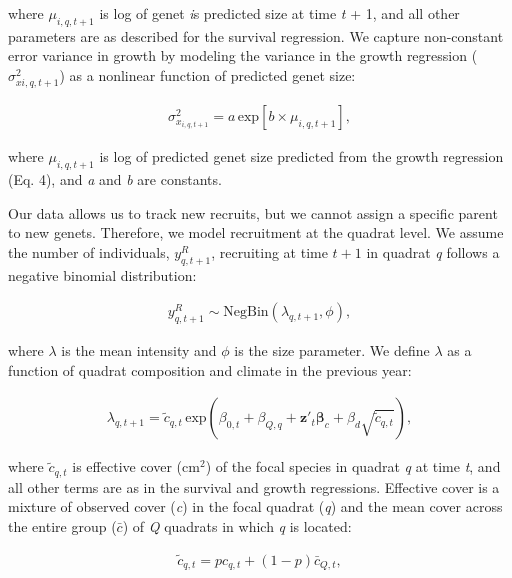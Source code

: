 \documentclass[12pt,]{article}
\begin{document}
where \(\mu_{i,q,t+1}\) is log of genet \emph{i}s predicted size at time
\emph{t} + 1, and all other parameters are as described for the survival
regression. We capture non-constant error variance in growth by modeling
the variance in the growth regression (\(\sigma^2_{x{i,q,t+1}}\)) as a
nonlinear function of predicted genet size:

\vspace{-3em}\begin{align}
\sigma^2_{x_{i,q,t+1}} = a \, \text{exp}[b \times \mu_{i,q,t+1}],
\end{align}\vspace{-3em}

where \(\mu_{i,q,t+1}\) is log of predicted genet size predicted from
the growth regression (Eq. 4), and \emph{a} and \emph{b} are constants.

Our data allows us to track new recruits, but we cannot assign a
specific parent to new genets. Therefore, we model recruitment at the
quadrat level. We assume the number of individuals, \(y^{R}_{q,t+1}\),
recruiting at time \(t+1\) in quadrat \emph{q} follows a negative
binomial distribution:

\vspace{-3em}\begin{align}
y^{R}_{q,t+1} \sim \text{NegBin}(\lambda_{q,t+1},\phi),
\end{align}\vspace{-3em}

where \(\lambda\) is the mean intensity and \(\phi\) is the size
parameter. We define \(\lambda\) as a function of quadrat composition
and climate in the previous year:

\vspace{-3em}\begin{align}
\lambda_{q,t+1} = \tilde{c}_{q,t} \, \text{exp}\left(\beta_{0,t} + \beta_{Q,q} + \textbf{z}'_t \boldsymbol{\beta}_c + \beta_{d}\sqrt{\tilde{c}_{q,t}}\right),
\end{align}\vspace{-3em}

where \(\tilde{c}_{q,t}\) is effective cover (\(\text{cm}^2\)) of the
focal species in quadrat \emph{q} at time \emph{t}, and all other terms
are as in the survival and growth regressions. Effective cover is a
mixture of observed cover (\emph{c}) in the focal quadrat (\emph{q}) and
the mean cover across the entire group (\(\bar{c}\)) of \emph{Q}
quadrats in which \emph{q} is located:

\vspace{-3em}\begin{align}
\tilde{c}_{q,t} = pc_{q,t} + (1-p)\bar{c}_{Q,t},
\end{align}\vspace{-3em}
\end{document}
